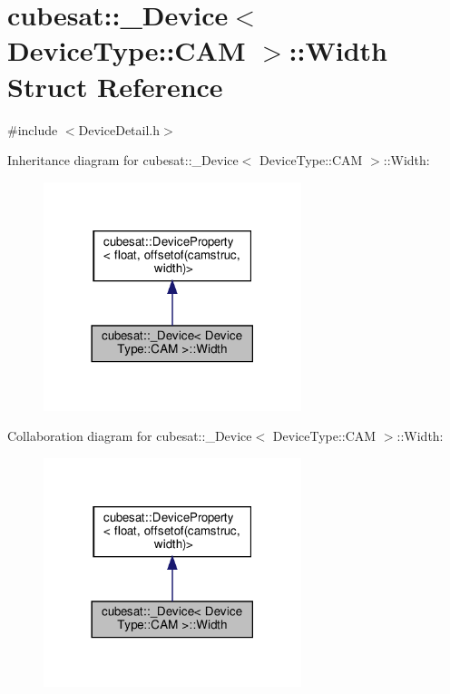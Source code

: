 \hypertarget{structcubesat_1_1__Device_3_01DeviceType_1_1CAM_01_4_1_1Width}{}\section{cubesat\+:\+:\+\_\+\+Device$<$ Device\+Type\+:\+:C\+AM $>$\+:\+:Width Struct Reference}
\label{structcubesat_1_1__Device_3_01DeviceType_1_1CAM_01_4_1_1Width}


{\ttfamily \#include $<$Device\+Detail.\+h$>$}



Inheritance diagram for cubesat\+:\+:\+\_\+\+Device$<$ Device\+Type\+:\+:C\+AM $>$\+:\+:Width\+:\nopagebreak
\begin{figure}[H]
\begin{center}
\leavevmode
\includegraphics[width=213pt]{structcubesat_1_1__Device_3_01DeviceType_1_1CAM_01_4_1_1Width__inherit__graph}
\end{center}
\end{figure}


Collaboration diagram for cubesat\+:\+:\+\_\+\+Device$<$ Device\+Type\+:\+:C\+AM $>$\+:\+:Width\+:\nopagebreak
\begin{figure}[H]
\begin{center}
\leavevmode
\includegraphics[width=213pt]{structcubesat_1_1__Device_3_01DeviceType_1_1CAM_01_4_1_1Width__coll__graph}
\end{center}
\end{figure}

